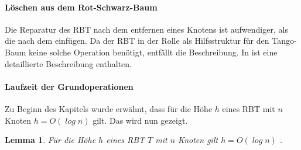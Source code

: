 \documentclass[a4paper,12pt]{article}
\begin{document}
\paragraph{Löschen aus dem Rot-Schwarz-Baum}
Die Reparatur des RBT nach dem entfernen eines Knotens ist aufwendiger, als die nach dem einfügen. Da der RBT in der Rolle als Hilfsstruktur für den Tango-Baum keine solche Operation benötigt, entfällt die Beschreibung. In \cite{algEinf} ist eine detaillierte Beschreibung enthalten. 
\paragraph{Laufzeit der Grundoperationen}
Zu Beginn des Kapitels wurde erwähnt, dass für die Höhe $h$ eines RBT mit $n$ Knoten $h = \mathit{O(\log {n})}$  gilt. Das wird nun gezeigt. 
\newtheorem{Lemma2}{Lemma}[section]
\begin{Lemma2} Für die Höhe $h$ eines RBT $T$ mit $n$ Knoten gilt $h = \mathit{O(\log {n})}$ . 
\end{Lemma2}
\end{document}
